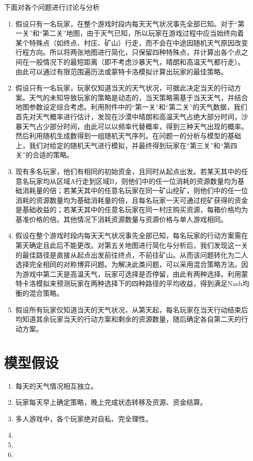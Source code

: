 \documentclass[withoutpre]{cumcmthesis} %
\begin{document}
下面对各个问题进行讨论与分析
\begin{enumerate}
    \item 假设只有一名玩家，在整个游戏时段内每天天气状况事先全部已知。对于“第一关”和“第二关”地图，由于天气已知，所以玩家在游戏过程中应当始终向着某个特殊点（如终点、村庄、矿山）行走，而不会在中途因随机天气原因改变行程方向。所以将两张地图进行简化，只保留四种特殊点，并计算出各个点之间在一般情况下的最短距离（即不考虑沙暴天气，晴朗和高温天气都行走）。由此可以通过有限范围遍历法或蒙特卡洛模拟计算出玩家的最佳策略。

    \item 假设只有一名玩家，玩家仅知道当天的天气状况，可据此决定当天的行动方案。天气的未知导致玩家的策略是动态的，当天策略需基于当天天气，并结合地图参数设定综合考虑。利用附件中的“第一关”和“第二关”的天气数据，我们首先对天气概率进行估计，发现在沙漠中晴朗和高温天气占绝大部分时间，沙暴天气占少部分时间，由此可以以频率代替概率，得到三种天气出现的概率。然后利用随机生成数得到一组随机天气序列。在问题一的分析与模型的基础上，我们对给定的随机天气进行模拟，并最终得到玩家在“第三关”和“第四关”的合适的策略。
    
    \item 现有多名玩家，他们有相同的初始资金，且同时从起点出发。若某天其中的任意名玩家均从区域A行走到区域B，则他们中的任一位消耗的资源数量均为基础消耗量的倍；若某天其中的任意名玩家在同一矿山挖矿，则他们中的任一位消耗的资源数量均为基础消耗量的倍，且每名玩家一天可通过挖矿获得的资金是基础收益的；若某天其中的任意名玩家在同一村庄购买资源，每箱价格均为基准价格的倍。其他情况下消耗资源数量与资源价格与单人游戏相同。
    
    \item 假设在整个游戏时段内每天天气状况事先全部已知，每名玩家的行动方案需在第天确定且此后不能更改。对第五关地图进行简化与分析后，我们发现这一关的最佳路径是直接从起点出发前往终点，不前往矿山。从而该问题转化为二人选择完全相同的对称博弈问题。为解决此类问题，可以采用混合策略方法。因为游戏中第二天是高温天气，玩家可选择是否停留，由此有两种选择。利用蒙特卡洛模拟来预测玩家在两种选择下的四种路径的平均收益，得到满足Nash均衡的混合策略。
    
    \item 假设所有玩家仅知道当天的天气状况，从第天起，每名玩家在当天行动结束后均知道其余玩家当天的行动方案和剩余的资源数量，随后确定各自第二天的行动方案。
\end{enumerate}

\section{模型假设}
\begin{enumerate}
    \item 每天的天气情况相互独立。
    \item 玩家每天早上确定策略，晚上完成状态转移及资源、资金结算。
    \item 多人游戏中，各个玩家绝对自私、完全理性。
    \item 
    \item 
    \item 
\end{enumerate}
\end{document}
